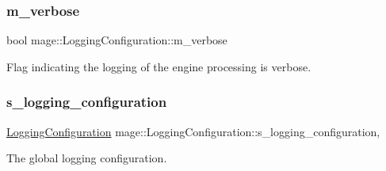 \subsubsection{\texorpdfstring{m\+\_\+verbose}{m\_verbose}}
{\footnotesize\ttfamily bool mage\+::\+Logging\+Configuration\+::m\+\_\+verbose\hspace{0.3cm}{\ttfamily [private]}}

Flag indicating the logging of the engine processing is verbose. \mbox{\label{classmage_1_1_logging_configuration_a056b2250472f997de3d99dcfc3c02940}} 
\subsubsection{\texorpdfstring{s\+\_\+logging\+\_\+configuration}{s\_logging\_configuration}}
{\footnotesize\ttfamily \mbox{\hyperlink{classmage_1_1_logging_configuration}{Logging\+Configuration}} mage\+::\+Logging\+Configuration\+::s\+\_\+logging\+\_\+configuration\hspace{0.3cm}{\ttfamily [static]}, {\ttfamily [private]}}

The global logging configuration. 